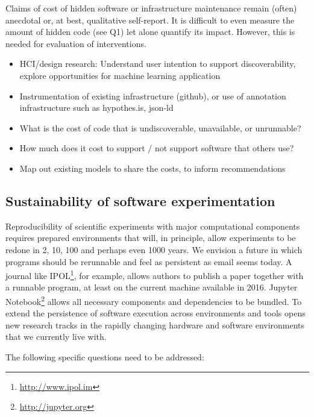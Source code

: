 \documentclass[a4paper,UKenglish]{dagman}
\begin{document}

Claims of cost of hidden software or infrastructure maintenance remain (often) anecdotal or, at best, qualitative self-report. It is difficult to even measure the amount of hidden code (see Q1) let alone quantify its impact. However, this is needed for evaluation of interventions.


\begin{itemize}
\item HCI/design research: Understand user intention to support discoverability, explore opportunities for machine learning application
\item Instrumentation of existing infrastructure (github), or use of annotation infrastructure such as hypothes.is, json-ld
\item What is the cost of code that is undiscoverable, unavailable, or unrunnable?
\item How much does it cost to support / not support software that others use? 
\item Map out existing models to share the costs, to inform recommendations
\end{itemize}


\subsection{Sustainability of software experimentation}

Reproducibility of scientific experiments with major computational components requires prepared environments that will, in principle, allow experiments to be redone in 2, 10, 100 and perhaps even 1000 years. We envision a future in which programs should be rerunnable and feel as persistent as email seems today. A journal like IPOL\footnote{\url{http://www.ipol.im}}, for example, allows authors to publish a paper together with a runnable program, at least on the current machine available in 2016. Jupyter Notebook\footnote{\url{http://jupyter.org}} allows all necessary components and dependencies to be bundled. To extend the persistence of software execution across environments and tools opens new research tracks in the rapidly changing hardware and software environments that we currently live with.

The following specific questions need to be addressed:
\end{document}
